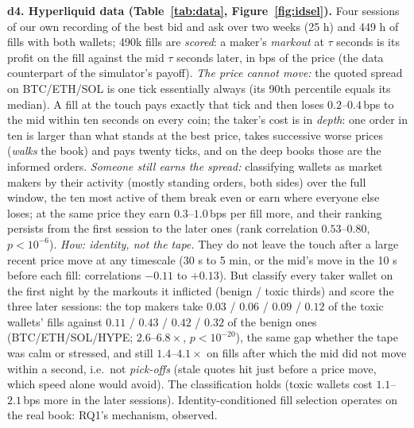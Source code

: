 \documentclass[10pt]{article}
\begin{document}
\textbf{d4. Hyperliquid data (Table~\ref{tab:data}, Figure~\ref{fig:idsel}).} Four sessions of our own recording of the best bid and ask over two weeks (25 h) and 449 h of fills with both wallets; 490k fills are \emph{scored}: a maker's \emph{markout} at $\tau$ seconds is its profit on the fill against the mid $\tau$ seconds later, in bps of the price (the data counterpart of the simulator's payoff). \emph{The price cannot move:} the quoted spread on BTC/ETH/SOL is one tick essentially always (its 90th percentile equals its median). A fill at the touch pays exactly that tick and then loses $0.2$--$0.4$\,bps to the mid within ten seconds on every coin; the taker's cost is in \emph{depth}: one order in ten is larger than what stands at the best price, takes successive worse prices (\emph{walks} the book) and pays twenty ticks, and on the deep books those are the informed orders. \emph{Someone still earns the spread:} classifying wallets as market makers by their activity (mostly standing orders, both sides) over the full window, the ten most active of them break even or earn where everyone else loses; at the same price they earn $0.3$--$1.0$\,bps per fill more, and their ranking persists from the first session to the later ones (rank correlation $0.53$--$0.80$, $p<10^{-6}$). \emph{How: identity, not the tape.} They do not leave the touch after a large recent price move at any timescale (30 s to 5 min, or the mid's move in the 10 s before each fill: correlations $-0.11$ to $+0.13$). But classify every taker wallet on the first night by the markouts it inflicted (benign / toxic thirds) and score the three later sessions: the top makers take $0.03$ / $0.06$ / $0.09$ / $0.12$ of the toxic wallets' fills against $0.11$ / $0.43$ / $0.42$ / $0.32$ of the benign ones (BTC/ETH/SOL/HYPE; $2.6$--$6.8\times$, $p<10^{-20}$), the same gap whether the tape was calm or stressed, and still $1.4$--$4.1\times$ on fills after which the mid did not move within a second, i.e.\ not \emph{pick-offs} (stale quotes hit just before a price move, which speed alone would avoid). The classification holds (toxic wallets cost $1.1$--$2.1$\,bps more in the later sessions). Identity-conditioned fill selection operates on the real book: RQ1's mechanism, observed.
\end{document}
